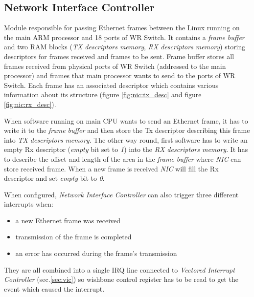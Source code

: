 \subsection{Network Interface Controller}

Module responsible for passing Ethernet frames between the Linux running
on the main ARM processor and 18 ports of WR Switch. It contains a \emph{frame
buffer} and two RAM blocks (\emph{TX descriptors memory}, \emph{RX descriptors
memory}) storing descriptors for frames received and frames to be sent.
Frame buffer stores all frames received from physical ports of WR Switch
(addressed to the main processor) and frames that main processor wants to send
to the ports of WR Switch. Each frame has an associated descriptor which
contains various information about its structure (figure \ref{fig:nic:tx_desc}
and figure \ref{fig:nic:rx_desc}).

When software running on main CPU wants to send an Ethernet frame, it has to
write it to the \emph{frame buffer} and then store the Tx descriptor describing
this frame into \emph{TX descriptors memory}. The other way round, first
software has to write an empty Rx descriptor (\emph{empty} bit set to \emph{1})
into the \emph{RX descriptors memory}. It has to describe the offset and length
of the area in the \emph{frame buffer} where \emph{NIC} can store received
frame. When a new frame is received \emph{NIC} will fill the Rx descriptor and
set \emph{empty} bit to \emph{0}.

When configured, \emph{Network Interface Controller} can also trigger three
different interrupts when:
\begin{itemize}
  \item a new Ethernet frame was received
  \item transmission of the frame is completed
  \item an error has occurred during the frame's transmission
\end{itemize} 
They are all combined into a single IRQ line connected to \emph{Vectored
Interrupt Controller} (sec.\ref{sec:vic}) so wishbone control register has to be
read to get the event which caused the interrupt.


